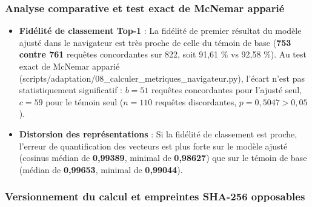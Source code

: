 \documentclass[11pt,a4paper]{article}
\newcommand{\code}[1]  {{\ttfamily #1}}
\begin{document}
\subsubsection*{Analyse comparative et test exact de McNemar apparié}
\begin{itemize}
\item \textbf{Fidélité de classement Top-1} : La fidélité de premier résultat du modèle ajusté dans le navigateur est très proche de celle du témoin de base (\textbf{753 contre 761} requêtes concordantes sur 822, soit 91,61 \% vs 92,58 \%). Au test exact de McNemar apparié (\code{scripts/\allowbreak{}adaptation/\allowbreak{}08\_\allowbreak{}calculer\_\allowbreak{}metriques\_\allowbreak{}navigateur.\allowbreak{}py}), l'écart n'est pas statistiquement significatif : $b = 51$ requêtes concordantes pour l'ajusté seul, $c = 59$ pour le témoin seul ($n = 110$ requêtes discordantes, $p = 0,5047 > 0,05$).
\item \textbf{Distorsion des représentations} : Si la fidélité de classement est proche, l'erreur de quantification des vecteurs est plus forte sur le modèle ajusté (cosinus médian de \textbf{0,99389}, minimal de \textbf{0,98627}) que sur le témoin de base (médian de \textbf{0,99653}, minimal de \textbf{0,99044}).
\end{itemize}

\subsubsection*{Versionnement du calcul et empreintes SHA-256 opposables}
\end{document}
